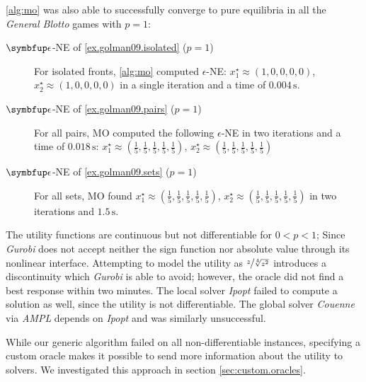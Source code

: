 \documentclass[../main.tex]{subfiles}
\begin{document}
\cref{alg:mo} was also able to successfully converge to pure equilibria in all the \emph{General Blotto} games with $p=1$:
\begin{description}
\item[$\beps$-NE of \ref{ex.golman09.isolated} ($p=1$)] For isolated fronts, \ref{alg:mo} computed $\epsilon$-NE:
$x_1^\star \approx (1, 0, 0, 0, 0)$, $x_2^\star \approx (1, 0, 0, 0, 0)$
in a single iteration and a time of $0.004\,\mathrm{s}$.
\item[$\beps$-NE of \ref{ex.golman09.pairs} ($p=1$)] For all pairs, MO computed the following $\epsilon$-NE in two iterations and a time of  $0.018\,\mathrm{s}$:
$x_1^\star \approx \left(\frac{1}{5}, \frac{1}{5}, \frac{1}{5}, \frac{1}{5}, \frac{1}{5}\right)$, $x_2^\star \approx \left(\frac{1}{5}, \frac{1}{5}, \frac{1}{5}, \frac{1}{5}, \frac{1}{5}\right)$
\item[$\beps$-NE of \ref{ex.golman09.sets} ($p=1$)] For all sets, MO found
$x_1^\star \approx \left(\frac{1}{5}, \frac{1}{5}, \frac{1}{5}, \frac{1}{5}, \frac{1}{5}\right)$, $x_2^\star \approx \left(\frac{1}{5}, \frac{1}{5}, \frac{1}{5}, \frac{1}{5}, \frac{1}{5}\right)$
in two iterations and $1.5\,\mathrm{s}$.
\end{description}

The utility functions are continuous but not differentiable for $0<p<1$; Since \emph{Gurobi} does not accept neither the sign function nor absolute value through its nonlinear interface. Attempting to model the utility as $\sfrac{z}{\sqrt[4]{z^2}}$ introduces a discontinuity which \emph{Gurobi} is able to avoid; however, the oracle did not find a best response within two minutes. The local solver \emph{Ipopt} failed to compute a solution as well, since the utility is not differentiable. The global solver \emph{Couenne} via \emph{AMPL} depends on \emph{Ipopt} and was similarly unsuccessful.

While our generic algorithm failed on all non-differentiable instances, specifying a custom oracle makes it possible to send more information about the utility to solvers. We investigated this approach in section \ref{sec:custom.oracles}.
\end{document}
